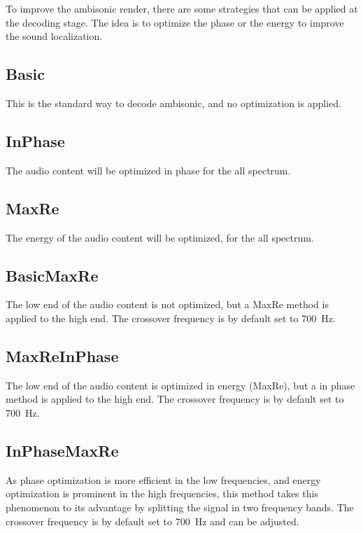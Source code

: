 \documentclass[
  letterpaper,
  DIV=11,
  numbers=noendperiod]{scrreport}
\begin{document}
To improve the ambisonic render, there are some strategies that can be
applied at the decoding stage. The idea is to optimize the phase or the
energy to improve the sound localization.

\hypertarget{basic}{%
\subsection{Basic}\label{basic}}

This is the standard way to decode ambisonic, and no optimization is
applied.

\hypertarget{inphase}{%
\subsection{InPhase}\label{inphase}}

The audio content will be optimized in phase for the all spectrum.

\hypertarget{maxre}{%
\subsection{MaxRe}\label{maxre}}

The energy of the audio content will be optimized, for the all spectrum.

\hypertarget{basicmaxre}{%
\subsection{BasicMaxRe}\label{basicmaxre}}

The low end of the audio content is not optimized, but a MaxRe method is
applied to the high end. The crossover frequency is by default set to
700~Hz.

\hypertarget{maxreinphase}{%
\subsection{MaxReInPhase}\label{maxreinphase}}

The low end of the audio content is optimized in energy (MaxRe), but a
in phase method is applied to the high end. The crossover frequency is
by default set to 700~Hz.

\hypertarget{inphasemaxre}{%
\subsection{InPhaseMaxRe}\label{inphasemaxre}}

As phase optimization is more efficient in the low frequencies, and
energy optimization is prominent in the high frequencies, this method
takes this phenomenon to its advantage by splitting the signal in two
frequency bands. The crossover frequency is by default set to 700~Hz and
can be adjusted.
\end{document}
